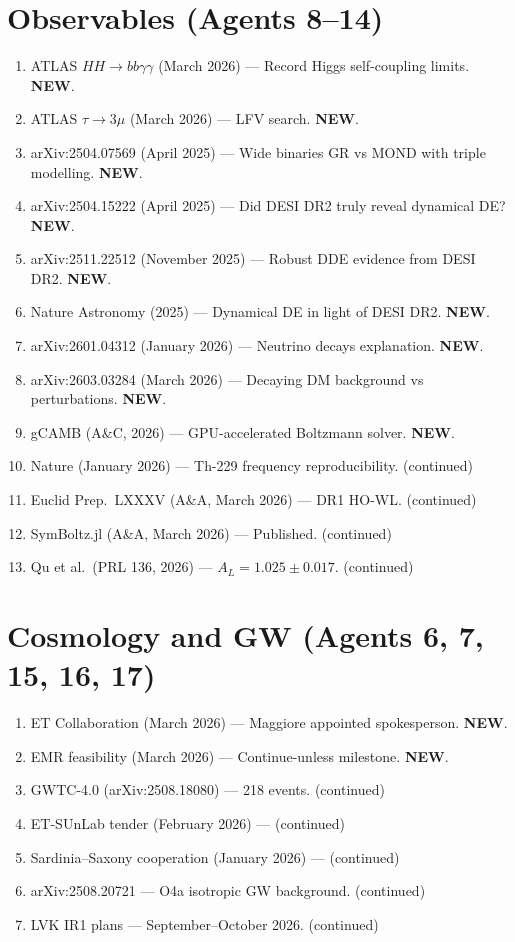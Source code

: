 \documentclass[11pt,a4paper]{article}
\newcommand{\NEW}{\textcolor{dfdblue}{\textbf{NEW}}}
\begin{document}
\section{Observables (Agents 8--14)}

\begin{enumerate}
\item ATLAS $HH \to bb\gamma\gamma$ (March 2026) --- Record Higgs self-coupling limits. \NEW.
\item ATLAS $\tau \to 3\mu$ (March 2026) --- LFV search. \NEW.
\item arXiv:2504.07569 (April 2025) --- Wide binaries GR vs MOND with triple modelling. \NEW.
\item arXiv:2504.15222 (April 2025) --- Did DESI DR2 truly reveal dynamical DE? \NEW.
\item arXiv:2511.22512 (November 2025) --- Robust DDE evidence from DESI DR2. \NEW.
\item Nature Astronomy (2025) --- Dynamical DE in light of DESI DR2. \NEW.
\item arXiv:2601.04312 (January 2026) --- Neutrino decays explanation. \NEW.
\item arXiv:2603.03284 (March 2026) --- Decaying DM background vs perturbations. \NEW.
\item gCAMB (A\&C, 2026) --- GPU-accelerated Boltzmann solver. \NEW.
\item Nature (January 2026) --- Th-229 frequency reproducibility. (continued)
\item Euclid Prep.\ LXXXV (A\&A, March 2026) --- DR1 HO-WL. (continued)
\item SymBoltz.jl (A\&A, March 2026) --- Published. (continued)
\item Qu et al.\ (PRL 136, 2026) --- $A_L = 1.025 \pm 0.017$. (continued)
\end{enumerate}

\section{Cosmology and GW (Agents 6, 7, 15, 16, 17)}

\begin{enumerate}
\item ET Collaboration (March 2026) --- Maggiore appointed spokesperson. \NEW.
\item EMR feasibility (March 2026) --- Continue-unless milestone. \NEW.
\item GWTC-4.0 (arXiv:2508.18080) --- 218 events. (continued)
\item ET-SUnLab tender (February 2026) --- (continued)
\item Sardinia--Saxony cooperation (January 2026) --- (continued)
\item arXiv:2508.20721 --- O4a isotropic GW background. (continued)
\item LVK IR1 plans --- September--October 2026. (continued)
\end{enumerate}
\end{document}
